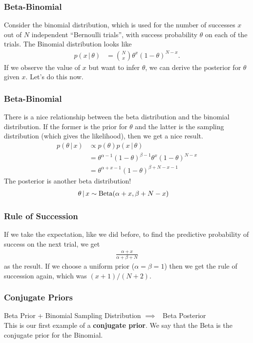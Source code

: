 \documentclass{beamer}
\newcommand{\given}{\,|\,}
\begin{document}
\begin{frame}
\frametitle{Beta-Binomial}
Consider the binomial distribution, which is used for the number of successes
$x$ out of $N$ independent ``Bernoulli trials'', with success probability
$\theta$ on each of the trials. The Binomial distribution looks like
\begin{align}
p(x \given \theta) &= \binom{N}{x}\theta^x(1-\theta)^{N-x}.
\end{align}
\pause
If we observe the value of $x$ but want to infer $\theta$, we can derive
the posterior for $\theta$ given $x$. Let's do this now.

\end{frame}


\begin{frame}
\frametitle{Beta-Binomial}
There is a nice relationship between the beta distribution and the binomial
distribution. If the former is the prior for $\theta$ and the latter is the
sampling distribution (which gives the likelihood), then we get a nice
result.\pause
\begin{align}
p(\theta \given x) &\propto p(\theta) p(x \given \theta) \\
    &= \theta^{\alpha-1}(1-\theta)^{\beta-1} \theta^x(1-\theta)^{N-x} \\
    &= \theta^{\alpha+x-1}(1-\theta)^{\beta+N-x-1}
\end{align}
\pause
The posterior is another beta distribution!
\begin{align}
\theta \given x &\sim \textnormal{Beta}(\alpha+x, \beta+N-x)
\end{align}

\end{frame}

\begin{frame}
\frametitle{Rule of Succession}
If we take the expectation, like we did before, to find the predictive
probability of success on the next trial, we get
\begin{align}
\frac{\alpha+x}{\alpha + \beta + N}
\end{align}
as the result. If we choose a uniform prior ($\alpha=\beta=1$)
then we get the rule of succession again, which was
$(x+1)/(N+2)$.

\end{frame}



\begin{frame}
\frametitle{Conjugate Priors}
Beta Prior + Binomial Sampling Distribution $\implies$~
Beta Posterior \\

This is our first example of a {\bf conjugate prior}.
We say that the Beta is the conjugate prior for the Binomial.

\end{frame}
\end{document}
